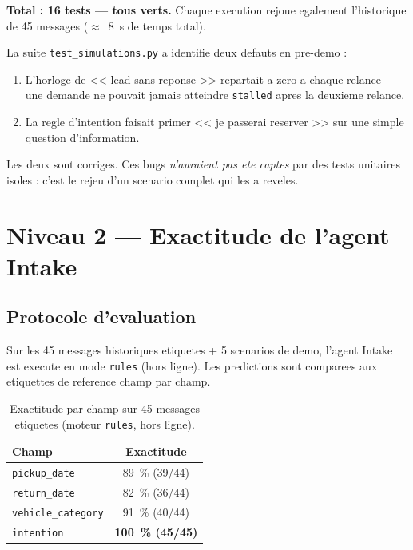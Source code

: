 \documentclass[12pt,a4paper,openany]{report}
\begin{document}
\textbf{Total : 16 tests --- tous verts.} Chaque execution rejoue egalement l'historique de 45 messages ($\approx$~8~s de temps total).

\begin{mechanismbox}
La suite \texttt{test\_simulations.py} a identifie deux defauts en pre-demo :
\begin{enumerate}
\item L'horloge de << lead sans reponse >> repartait a zero a chaque relance --- une demande ne pouvait jamais atteindre \texttt{stalled} apres la deuxieme relance.
\item La regle d'intention faisait primer << je passerai reserver >> sur une simple question d'information.
\end{enumerate}
Les deux sont corriges. Ces bugs \emph{n'auraient pas ete captes} par des tests unitaires isoles : c'est le rejeu d'un scenario complet qui les a reveles.
\end{mechanismbox}

\section{Niveau 2 --- Exactitude de l'agent Intake}

\subsection{Protocole d'evaluation}
Sur les 45 messages historiques etiquetes + 5 scenarios de demo, l'agent Intake est execute en mode \texttt{rules} (hors ligne). Les predictions sont comparees aux etiquettes de reference champ par champ.

\begin{table}[H]\centering\small
\caption{Exactitude par champ sur 45 messages etiquetes (moteur \texttt{rules}, hors ligne).}
\label{tab:exactitude}
\begin{tabularx}{0.8\textwidth}{X c}\toprule
\rowcolor{boxBlue!30}\textbf{Champ} & \textbf{Exactitude}\\\midrule
\texttt{pickup\_date}      & 89~\% (39/44)\\
\texttt{return\_date}      & 82~\% (36/44)\\
\texttt{vehicle\_category} & 91~\% (40/44)\\
\texttt{intention}         & \textbf{100~\% (45/45)}\\
\bottomrule
\end{tabularx}
\end{table}
\end{document}
